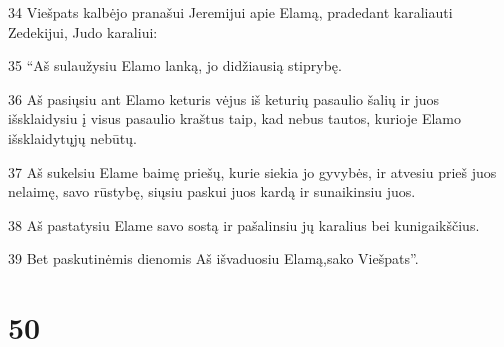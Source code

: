 \par 34 Viešpats kalbėjo pranašui Jeremijui apie Elamą, pradedant karaliauti Zedekijui, Judo karaliui: 
\par 35 “Aš sulaužysiu Elamo lanką, jo didžiausią stiprybę. 
\par 36 Aš pasiųsiu ant Elamo keturis vėjus iš keturių pasaulio šalių ir juos išsklaidysiu į visus pasaulio kraštus taip, kad nebus tautos, kurioje Elamo išsklaidytųjų nebūtų. 
\par 37 Aš sukelsiu Elame baimę priešų, kurie siekia jo gyvybės, ir atvesiu prieš juos nelaimę, savo rūstybę, siųsiu paskui juos kardą ir sunaikinsiu juos. 
\par 38 Aš pastatysiu Elame savo sostą ir pašalinsiu jų karalius bei kunigaikščius. 
\par 39 Bet paskutinėmis dienomis Aš išvaduosiu Elamą,­sako Viešpats”.



\chapter{50}


